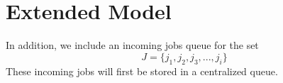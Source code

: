 \documentclass[conference]{IEEEtran}
\begin{document}

\section{Extended Model}

In addition, we include an incoming jobs queue for the set $$J =\{j_1,j_2,j_3, ..., j_i\}$$
These incoming jobs will first be stored in a centralized queue.\\\\
\end{document}
